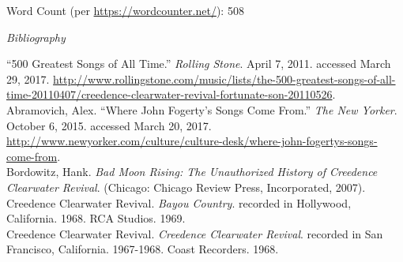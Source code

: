 \documentclass[10pt]{article}
\begin{document}
\vfill
Word Count (per \url{https://wordcounter.net/}): 508

\newpage
\singlespacing
\begin{center}
\textit{{\large Bibliography}}
\end{center}

\begin{hangparas}{15pt}{1}
``500 Greatest Songs of All Time.'' \textit{Rolling Stone}. April 7, 2011. accessed March 29, 2017. \url{http://www.rollingstone.com/music/lists/the-500-greatest-songs-of-all-time-20110407/creedence-clearwater-revival-fortunate-son-20110526}. \\

Abramovich, Alex. ``Where John Fogerty's Songs Come From.'' \textit{The New Yorker}. October 6, 2015. accessed March 20, 2017. \url{http://www.newyorker.com/culture/culture-desk/where-john-fogertys-songs-come-from}. \\

Bordowitz, Hank. \textit{Bad Moon Rising: The Unauthorized History of Creedence Clearwater Revival}. (Chicago: Chicago Review Press, Incorporated, 2007). \\

Creedence Clearwater Revival. \textit{Bayou Country}. recorded in Hollywood, California. 1968. RCA Studios. 1969. \\

Creedence Clearwater Revival. \textit{Creedence Clearwater Revival}. recorded in San Francisco, California. 1967-1968. Coast Recorders. 1968. \\
\end{hangparas}
\end{document}
